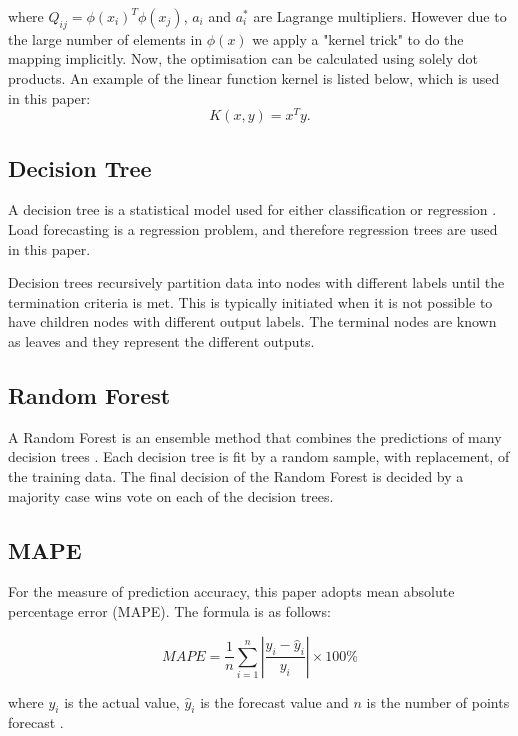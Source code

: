 \noindent where $Q_{ij}=\phi(x_i)^T\phi(x_j)$, $a_i$ and $a_i^*$ are Lagrange multipliers. However due to the large number of elements in $\phi(x)$ we apply a "kernel trick" to do the mapping implicitly. Now, the optimisation can be calculated using solely dot products. An example of the linear function kernel is listed below, which is used in this paper:
\begin{equation}
K(x,y)=x^Ty.
\end{equation}

\subsection{Decision Tree}

A decision tree is a statistical model used for either classification or regression \cite{breiman1984classification}. Load forecasting is a regression problem, and therefore regression trees are used in this paper. 

Decision trees recursively partition data into nodes with different labels until the termination criteria is met. This is typically initiated when it is not possible to have children nodes with different output labels. The terminal nodes are known as leaves and they represent the different outputs.

\subsection{Random Forest}

A Random Forest is an ensemble method that combines the predictions of many decision trees \cite{Breiman2001}. Each decision tree is fit by a random sample, with replacement, of the training data. The final decision of the Random Forest is decided by a majority case wins vote on each of the decision trees.


\subsection{MAPE}

For the measure of prediction accuracy, this paper adopts mean absolute percentage error (MAPE). The formula is as follows:

\begin{equation}
MAPE=\frac{1}{n}\sum_{i=1}^n\left|\frac{y_i-\hat{y}_i}{y_i}\right|\times 100\%
\end{equation}

\noindent where $y_i$ is the actual value, $\hat{y}_i$ is the forecast value and $n$ is the number of points forecast \cite{Li2016}.


